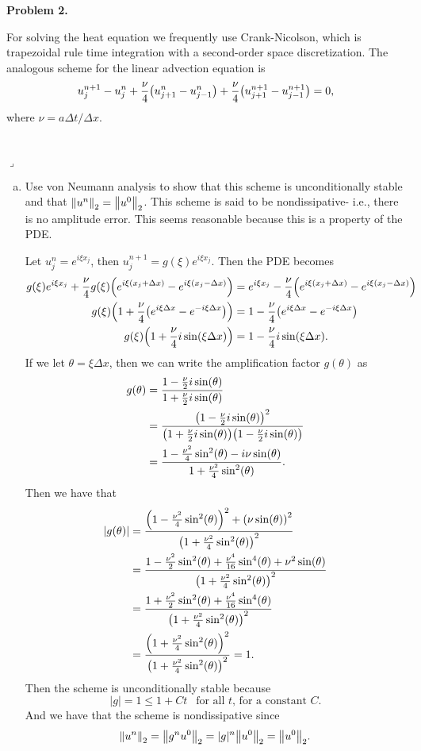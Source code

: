 \documentclass[12pt]{article}
\newenvironment{myprob}[1]
    {%
    \noindent{\Huge$\ulcorner$}\textbf{#1.}\begin{em}
    }
    { 
    \end{em} \\ \hphantom{l} \hfill {\Huge$\lrcorner$} }
\begin{document}
\begin{myprob}{Problem 2}
For solving the heat equation we frequently use Crank-Nicolson, which is trapezoidal rule time integration with a second-order space discretization.  The analogous scheme for the linear advection equation is
$$u_{j}^{n+1} - u_{j}^{n} + \dfrac{\nu}{4}\qty(u_{j+1}^{n}-u_{j-1}^{n}) + \dfrac{\nu}{4}\qty(u_{j+1}^{n+1}-u_{j-1}^{n+1}) =0,$$
where $\nu = a\Delta t/\Delta x$.
\end{myprob}
\begin{enumerate}[(a)]
\item Use von Neumann analysis to show that this scheme is unconditionally stable and that $\norm{u^n}_2 = \norm{u^0}_2$.  This scheme is said to be nondissipative- i.e., there is no amplitude error.  This seems reasonable because this is a property of the PDE.


Let $u_j^n = e^{i\xi x_j}$, then $u_j^{n+1} = g(\xi)e^{i\xi x_j}$.
Then the PDE becomes
\begin{align*}
g(\xi)e^{i\xi x_j} + \dfrac{\nu}{4}g(\xi)\qty(e^{i\xi(x_j+\Delta x)}- e^{i\xi(x_j-\Delta x)}) &= e^{i\xi x_j} - \dfrac{\nu}{4}\qty(e^{i\xi(x_j+\Delta x)}- e^{i\xi(x_j-\Delta x)}) \\
g(\xi) \qty(1 + \dfrac{\nu}{4}\qty(e^{i\xi\Delta x}- e^{-i\xi \Delta x})) &= 1 - \dfrac{\nu}{4}\qty(e^{i\xi\Delta x}-e^{-i\xi\Delta x})\\
g(\xi) \qty(1+ \dfrac{\nu}{4}i\sin(\xi \Delta x)) &= 1 - \dfrac{\nu}{4} i \sin(\xi\Delta x).
\end{align*}
If we let $\theta=\xi \Delta x$, then we can write the amplification factor $g(\theta)$ as
\begin{align*}
g(\theta) &= \dfrac{1-\frac{\nu}{2}i\sin(\theta)}{1+\frac{\nu}{2}i\sin(\theta)} \\
&= \dfrac{\qty(1-\frac{\nu}{2}i\sin(\theta))^2}{\qty(1+\frac{\nu}{2}i\sin(\theta))\qty(1-\frac{\nu}{2}i\sin(\theta))} \\
&= \dfrac{1-\frac{\nu^2}{4}\sin^2(\theta) - i \nu \sin(\theta)}{1+\frac{\nu^2}{4}\sin^2(\theta)}.
\end{align*}
Then we have that
\begin{align*}
|g(\theta)| &= \dfrac{\qty(1-\frac{\nu^2}{4}\sin^2(\theta))^2 + \qty(\nu \sin(\theta))^2}{\qty(1+\frac{\nu^2}{4}\sin^2(\theta))^2} \\
&= \dfrac{1-\frac{\nu^2}{2}\sin^2(\theta) + \frac{\nu^4}{16}\sin^4(\theta) + \nu^2\sin(\theta)}{\qty(1+\frac{\nu^2}{4}\sin^2(\theta))^2} \\
&= \dfrac{1+\frac{\nu^2}{2}\sin^2(\theta) + \frac{\nu^4}{16}\sin^4(\theta)}{\qty(1+\frac{\nu^2}{4}\sin^2(\theta))^2} \\
&= \dfrac{\qty(1+\frac{\nu^2}{4}\sin^2(\theta))^2}{\qty(1+\frac{\nu^2}{4}\sin^2(\theta))^2} = 1.
\end{align*}
Then the scheme is unconditionally stable because
$$|g| = 1 \leq 1 + C t  \ \ \text{ for all $t$, for a constant $C$.}$$
And we have that the scheme is nondissipative since
$$\norm{u^n}_2 = \norm{g^n u^0}_2 = |g|^n \norm{u^0}_2 = \norm{u^0}_2.$$


\end{enumerate}
\end{document}
